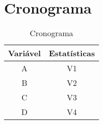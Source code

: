 \chapter{Cronograma}

\begin{table}[H]
    \centering
    \caption{Cronograma}
    \begin{tabular}{c|c}
        \hline
         \textbf{Variável} & \textbf{Estatísticas}  \\ \hline
         A & V1\\
         B & V2\\
         C & V3\\
         D & V4\\ \hline
    \end{tabular}
    \label{tab:my_tab}
\end{table}

